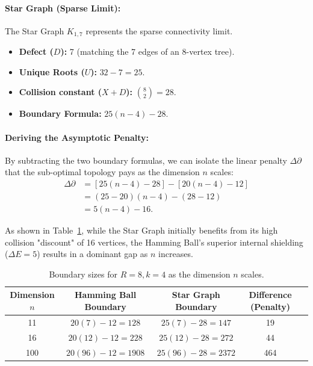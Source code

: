\documentclass[11pt, letterpaper]{article}
\theoremstyle{definition}
\theoremstyle{remark}
\begin{document}
\paragraph{Star Graph (Sparse Limit):}
The Star Graph $K_{1,7}$ represents the sparse connectivity limit.
\begin{itemize}
    \item \textbf{Defect ($D$):} 7 (matching the 7 edges of an 8-vertex tree).
    \item \textbf{Unique Roots ($U$):} $32 - 7 = 25$.
    \item \textbf{Collision constant ($X+D$):} $\binom{8}{2} = 28$.
    \item \textbf{Boundary Formula:} $25(n-4) - 28$.
\end{itemize}

\paragraph{Deriving the Asymptotic Penalty:}
By subtracting the two boundary formulas, we can isolate the linear penalty $\Delta \partial$ that the sub-optimal topology pays as the dimension $n$ scales:
\begin{align*}
\Delta \partial &= [25(n-4) - 28] - [20(n-4) - 12] \\
&= (25-20)(n-4) - (28-12) \\
&= 5(n-4) - 16.
\end{align*}

As shown in Table~\ref{tab:comparison}, while the Star Graph initially benefits from its high collision "discount" of 16 vertices, the Hamming Ball's superior internal shielding ($\Delta E = 5$) results in a dominant gap as $n$ increases.

\begin{table}[ht]
\centering
\caption{Boundary sizes for $R=8, k=4$ as the dimension $n$ scales.}
\label{tab:comparison}
\begin{tabular}{@{}ccccc@{}}
\toprule
Dimension $n$ & Hamming Ball Boundary & Star Graph Boundary & Difference (Penalty) \\
\midrule
11 & $20(7) - 12 = 128$ & $25(7) - 28 = 147$ & 19 \\
16 & $20(12) - 12 = 228$ & $25(12) - 28 = 272$ & 44 \\
100 & $20(96) - 12 = 1908$ & $25(96) - 28 = 2372$ & 464 \\
\bottomrule
\end{tabular}
\end{table}
\end{document}
